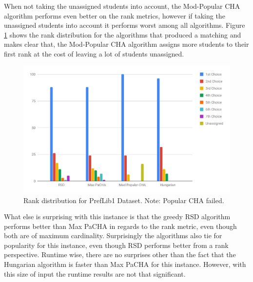 When not taking the unassigned students into account, the Mod-Popular CHA algorithm performs even better on the rank metrics, however if taking the unassigned students into account it performs worst among all algorithms. Figure \ref{fig:preflib1-rank-distribution} shows the rank distribution for the algorithms that produced a matching and makes clear that, the Mod-Popular CHA algorithm assigns more students to their first rank at the cost of leaving a lot of students unassigned. 

\begin{figure}[h!]
  \centering
    \includegraphics[width=0.9\linewidth]{assets/plots/preflib1-ranks.pdf}    
    \caption{Rank distribution for PrefLib1 Dataset. Note: Popular CHA failed.}
    \label{fig:preflib1-rank-distribution}
\end{figure}

What else is surprising with this instance is that the greedy RSD algorithm performs better than Max PaCHA in regards to the rank metric, even though both are of maximum cardinality. Surprisingly the algorithms also tie for popularity for this instance, even though RSD performs better from a rank perspective. Runtime wise, there are no surprises other than the fact that the Hungarian algorithm is faster than Max PaCHA for this instance. However, with this size of input the runtime results are not that significant.

